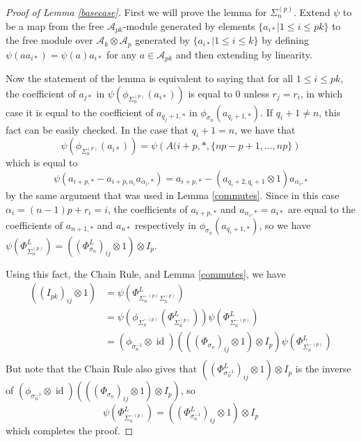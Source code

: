 \documentclass{amsart}[11pt,fullpage]
\def\ltblue{blue!20!white}
\def\ltgreen{green!20!white}
\def\A{{\mathcal A}}
\def\s{{\sigma}}
\def\a{\alpha}
\newcommand\id{\operatorname{id}}
\newcommand\Sp{\Sigma^{(p)}}
\newcommand\SpM{\Sigma^{-(p)}}
\theoremstyle{definition}
\begin{document}
\begin{proof} [Proof of Lemma \ref{basecase}]\todo[color=\ltblue]{check}
First we will prove the lemma for $\Sp_n$. Extend $\psi$ to be a map from the free $\A_{pk}$-module generated by elements $\{a_{i*}|1\le i\le pk\}$ to the free module over $\A_{k}\otimes \A_{p}$ generated by $\{a_{i*}|1\le i\le k\}$ \todo[color=\ltgreen]{do you want $k$ here, or $pk$?} by defining $\psi(aa_{i*}) = \psi(a)a_{i*}$ for any $a\in\A_{pk}$ and then extending by linearity. 

Now the statement of the lemma is equivalent to saying that for all $1\le i\le pk$, the coefficient of $a_{j*}$ in $\psi\left(\phi_{\Sp_n}(a_{i*})\right)$ is equal to 0 unless $r_j = r_i$, in which case it is equal to the coefficient of $a_{q_j+1,*}$ in $\phi_{\s_n}(a_{q_i+1,*})$. If $q_i + 1 \ne n$, this fact can be easily checked. In the case that $q_i + 1 = n$, we have that
$$\psi\left(\phi_{\Sp_n}(a_{i*})\right) = \psi\left(A(i+p,*,\{np-p+1,\ldots,np\}\right)$$
\noindent which is equal to
$$\psi(a_{i+p,*} - a_{i+p,\a_i}a_{\a_i,*}) = a_{i+p,*} - (a_{q_i+2,q_i+1}\otimes 1)a_{\a_i,*}$$
by the same argument that was used in Lemma \ref{commutes}. Since in this case $\alpha_i=(n-1)p+r_i = i$, the coefficients of $a_{i+p,*}$ and $a_{\a_i,*}=a_{i*}$ are equal to the coefficients of $a_{n+1,*}$ and $a_{n*}$ respectively in $\phi_{\s_n}(a_{q_i+1,*})$, so we have $\psi\left(\Phi_{\Sp_n}^L\right) = \left(\left(\Phi_{\s_n}^L\right)_{ij}\otimes 1\right)\otimes I_p$.

Using this fact, the Chain Rule, and Lemma \ref{commutes}, we have
\begin{align*}
\left(\left(I_{pk}\right)_{ij}\otimes 1\right) &= \psi\left(\Phi_{\SpM_n\Sp_n}^L\right)\\
&= \psi\left(\phi_{\SpM_n}\left(\Phi_{\Sp_n}^L\right)\right)\psi\left(\Phi_{\SpM_n}^L\right)\\
&= \left(\phi_{\s_n^{-1}}\otimes \id\right)\left(\left(\left(\Phi_{\s_n}\right)_{ij}\otimes 1\right)\otimes I_p\right)\psi\left(\Phi_{\SpM_n}^L\right)\\
\end{align*}
But note that the Chain Rule also gives that $\left(\left(\Phi_{\s_n^{-1}}^L\right)_{ij}\otimes 1\right)\otimes I_p$ is the inverse of $\left(\phi_{\s_n^{-1}}\otimes \id\right)\left(\left(\left(\Phi_{\s_n}\right)_{ij}\otimes 1\right)\otimes I_p\right)$, so 
$$\psi\left(\Phi_{\SpM_n}^L\right) = \left(\left(\Phi_{\s_n^{-1}}^L\right)_{ij}\otimes 1\right)\otimes I_p$$
\noindent which completes the proof.
\end{proof}
\end{document}
